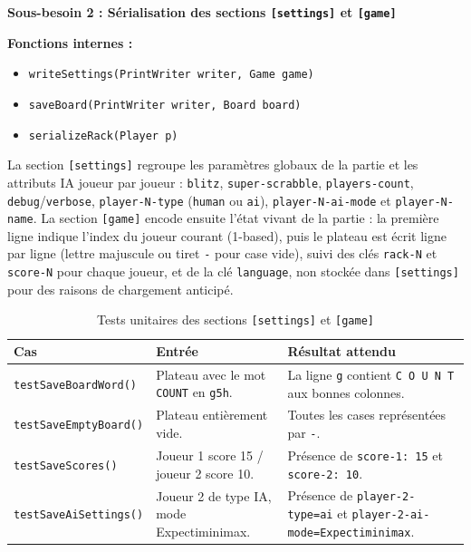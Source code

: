 \documentclass[a4paper]{article}
\begin{document}
\begin{besoinbox}
    \textbf{\large Sous-besoin 2 : Sérialisation des sections \texttt{[settings]} et \texttt{[game]}}

    \vspace{2mm}
    \textbf{Fonctions internes :}
    \begin{itemize}
        \item \texttt{writeSettings(PrintWriter writer, Game game)}
        \item \texttt{saveBoard(PrintWriter writer, Board board)}
        \item \texttt{serializeRack(Player p)}
    \end{itemize}
    \vspace{2mm}

    La section \texttt{[settings]} regroupe les paramètres globaux de la partie et les attributs IA joueur par joueur : \texttt{blitz}, \texttt{super-scrabble}, \texttt{players-count}, \texttt{debug}/\texttt{verbose}, \texttt{player-N-type} (\texttt{human} ou \texttt{ai}), \texttt{player-N-ai-mode} et \texttt{player-N-name}. La section \texttt{[game]} encode ensuite l'état vivant de la partie : la première ligne indique l'index du joueur courant (1-based), puis le plateau est écrit ligne par ligne (lettre majuscule ou tiret \texttt{-} pour case vide), suivi des clés \texttt{rack-N} et \texttt{score-N} pour chaque joueur, et de la clé \texttt{language}, non stockée dans \texttt{[settings]} pour des raisons de chargement anticipé.
\end{besoinbox}

\begin{table}[H]
    \centering
    \small
    \begin{tabular}{p{4.5cm} p{4.5cm} p{5.5cm}}
        \toprule
        \textbf{Cas} & \textbf{Entrée} & \textbf{Résultat attendu} \\
        \midrule
        \texttt{testSaveBoardWord()} & Plateau avec le mot \texttt{COUNT} en \texttt{g5h}. & La ligne \texttt{g} contient \texttt{C O U N T} aux bonnes colonnes. \\
        \midrule
        \texttt{testSaveEmptyBoard()} & Plateau entièrement vide. & Toutes les cases représentées par \texttt{-}. \\
        \midrule
        \texttt{testSaveScores()} & Joueur 1 score 15 / joueur 2 score 10. & Présence de \texttt{score-1: 15} et \texttt{score-2: 10}. \\
        \midrule
        \texttt{testSaveAiSettings()} & Joueur 2 de type IA, mode Expectiminimax. & Présence de \texttt{player-2-type=ai} et \texttt{player-2-ai-mode=Expectiminimax}. \\
        \bottomrule
    \end{tabular}
    \caption{Tests unitaires des sections \texttt{[settings]} et \texttt{[game]}}
\end{table}
\end{document}
